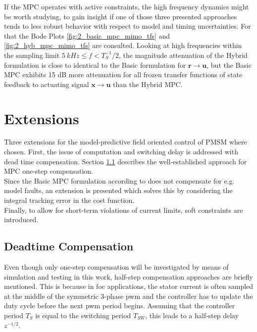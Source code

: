 If the MPC operates with active constraints, the high frequency dynamics might be worth studying, to gain insight if one of those three presented approaches tends to less robust behavior with respect to model and timing uncertainties. For that the Bode Plots \ref{fig:2_basic_mpc_mimo_tfs} and \ref{fig:2_hyb_mpc_mimo_tfs} are consulted. Looking at high frequencies within the sampling limit $ \qty{5}{kHz} \le f <  T_S^{-1}/2$, the magnitude attenuation of the Hybrid formulation is close to identical to the Basic formulation for $\bm{r} \rightarrow \bm{u}$, but the Basic MPC exhibits 15 dB more attenuation for all frozen transfer functions of state feedback to actuating signal $\bm{x} \rightarrow \bm{u}$ than the Hybrid MPC. 

\section{Extensions} \label{sec:mpcc_ext}
Three extensions for the model-predictive field oriented control of PMSM where chosen. First, the issue of computation and switching delay is addressed with dead time compensation. Section \ref{sec:ext_deadt_comp} describes the well-established approach for MPC one-step compensation.\\
Since the Basic MPC formulation according to \cite{mpcCamacho} does not compensate for e.g. model faults, an extension is presented which solves this by considering the integral tracking error in the cost function.\\
Finally, to allow for short-term violations of current limits, soft constraints are introduced.

\subsection{Deadtime Compensation} \label{sec:ext_deadt_comp}
Even though only one-step compensation will be investigated by means of simulation and testing in this  work, half-step compensation approaches are briefly mentioned. This is because in \acrshort{foc} applications, the stator current is often sampled at the middle of the symmetric 3-phase \acrshort{pwm} and the controller has to update the duty cycle before the next \acrshort{pwm} period begins. Assuming that the controller period $T_S$ is equal to the switching period $T_{SW}$, this leads to a half-step delay $z^{-1/2}$.
